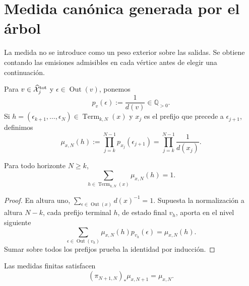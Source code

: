 \section{Medida canónica generada por el árbol}
\label{sec:continuo-comun-medida}

La medida no se introduce como un peso exterior sobre las salidas.  Se obtiene
contando las emisiones admisibles en cada vértice antes de elegir una
continuación.

\begin{definition}
\label{def:continuo-comun-medida-finita}
Para \(v\in\widehat{\mathcal X}^{\rm tot}_j\) y
\(\epsilon\in\operatorname{Out}(v)\), ponemos
\begin{equation}
\label{eq:continuo-comun-peso-local}
 p_v(\epsilon):=\frac{1}{d(v)}\in\mathbb Q_{>0}.
\end{equation}
Si
\(h=(\epsilon_{k+1},\ldots,\epsilon_N)\in
\operatorname{Term}_{k,N}(x)\) y \(x_j\) es el prefijo que precede a
\(\epsilon_{j+1}\), definimos
\begin{equation}
\label{eq:continuo-comun-medida-horizonte}
 \mu_{x,N}(h)
 :=\prod_{j=k}^{N-1}p_{x_j}(\epsilon_{j+1})
 =\prod_{j=k}^{N-1}\frac{1}{d(x_j)}.
\end{equation}
\end{definition}

\begin{lemma}[Normalización]
\label{lem:continuo-comun-medida-normalizada}
Para todo horizonte \(N\geq k\),
\begin{equation}
\label{eq:continuo-comun-medida-suma-uno}
 \sum_{h\in\operatorname{Term}_{k,N}(x)}\mu_{x,N}(h)=1.
\end{equation}
\end{lemma}

\begin{proof}
En altura uno,
\(\sum_{\epsilon\in\operatorname{Out}(x)}d(x)^{-1}=1\).  Supuesta la
normalización a altura \(N-k\), cada prefijo terminal \(h\), de estado final
\(v_h\), aporta en el nivel siguiente
\[
 \sum_{\epsilon\in\operatorname{Out}(v_h)}
 \mu_{x,N}(h)p_{v_h}(\epsilon)
 =\mu_{x,N}(h).
\]
Sumar sobre todos los prefijos prueba la identidad por inducción.
\end{proof}

\begin{proposition}
\label{prop:continuo-comun-medida-consistente}
Las medidas finitas satisfacen
\begin{equation}
\label{eq:continuo-comun-medida-pushforward}
 (\pi_{N+1,N})_*\mu_{x,N+1}=\mu_{x,N}.
\end{equation}
\end{proposition}

